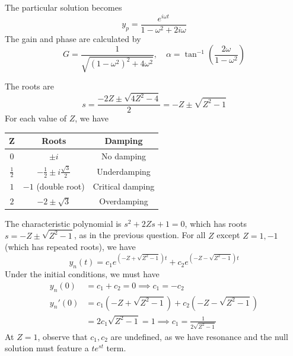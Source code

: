 \documentclass[a4paper]{article}
\begin{document}
The particular solution becomes
\[
	y_{p } = \frac{e^{i \omega t }}{1 - \omega^{2} + 2i \omega} 
\]
The gain and phase are calculated by
\[
	G = \frac{1}{\sqrt{\!\left( 1 - \omega^{2} \right)^{2} + 4 \omega^{2}}}, \quad \alpha = \tan^{-1}\!\left( \frac{2 \omega}{1 - \omega^{2}} \right)
\]


The roots are
\[
	s = \frac{-2Z \pm \sqrt{4Z^{2} - 4}}{2} = -Z \pm \sqrt{Z^{2} - 1}
\]
For each value of \( Z \), we have
\begin{center}
	\renewcommand{\arraystretch}{2.5}
	\begin{tabular}{|c|c|c|}
		\hline
		\( \pmb{Z} \) & \textbf{Roots} & \textbf{Damping} \\
		\hline
		\hline
		\( 0 \) & \( \pm i \) & No damping\\
		\hline
		\( \displaystyle{\frac{1}{2}} \) & \( \displaystyle{-\frac{1}{2} \pm i \frac{\sqrt{3}}{2}} \) & Underdamping \\
		\hline
		\( 1 \) & \( -1 \) (double root) & Critical damping\\
		\hline
		\( 2 \) & \( -2 \pm \sqrt{3} \) & Overdamping \\
		\hline
	\end{tabular}
\end{center}


The characteristic polynomial is \( s^{2} + 2Zs + 1 = 0 \), which has roots \( s = -Z \pm \sqrt{Z^{2} - 1} \), as in the previous question. For all \( Z  \) except \( Z = 1, -1 \) (which has repeated roots), we have
\[
	y_{n }\!\left( t  \right) = c_{1} e^{\!\left( -Z + \sqrt{Z^{2} - 1} \right) t} + c_{2} e^{\!\left( -Z - \sqrt{Z^{2} - 1} \right) t } 
\]
Under the initial conditions, we must have
\begin{align*}
	y_{n }\!\left( 0 \right) & = c_{1} + c_{2} = 0 \implies \boxed{c_{1} = - c_{2}} \\[12pt]
	y_{n }'\!\left( 0 \right) & = c_{1} \!\left( -Z + \sqrt{Z^{2} - 1} \right) + c_{2} \!\left( -Z - \sqrt{Z^{2} - 1} \right) \\[12pt]
				  & = 2c_{1} \sqrt{Z^{2} - 1} = 1 \implies \boxed{c_{1} = \frac{1}{2 \sqrt{Z^{2} - 1}}}
\end{align*}
At \( Z = 1 \), observe that \( c_{1}, c_{2} \) are undefined, as we have resonance and the null solution must feature a \( te^{st } \) term.
\end{document}
